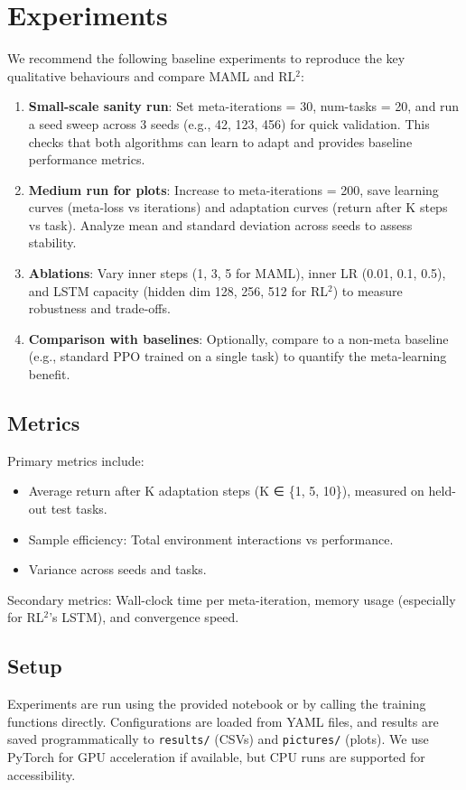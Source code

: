 \documentclass[11pt,a4paper]{article}
\begin{document}
\section{Experiments}
We recommend the following baseline experiments to reproduce the key qualitative behaviours and compare MAML and RL$^2$:
\begin{enumerate}
  \item \textbf{Small-scale sanity run}: Set meta-iterations = 30, num-tasks = 20, and run a seed sweep across 3 seeds (e.g., 42, 123, 456) for quick validation. This checks that both algorithms can learn to adapt and provides baseline performance metrics.
  \item \textbf{Medium run for plots}: Increase to meta-iterations = 200, save learning curves (meta-loss vs iterations) and adaptation curves (return after K steps vs task). Analyze mean and standard deviation across seeds to assess stability.
  \item \textbf{Ablations}: Vary inner steps (1, 3, 5 for MAML), inner LR (0.01, 0.1, 0.5), and LSTM capacity (hidden dim 128, 256, 512 for RL$^2$) to measure robustness and trade-offs.
  \item \textbf{Comparison with baselines}: Optionally, compare to a non-meta baseline (e.g., standard PPO trained on a single task) to quantify the meta-learning benefit.
\end{enumerate}

\subsection{Metrics}
Primary metrics include:
\begin{itemize}
  \item Average return after K adaptation steps (K ∈ \{1, 5, 10\}), measured on held-out test tasks.
  \item Sample efficiency: Total environment interactions vs performance.
  \item Variance across seeds and tasks.
\end{itemize}
Secondary metrics: Wall-clock time per meta-iteration, memory usage (especially for RL$^2$'s LSTM), and convergence speed.

\subsection{Setup}
Experiments are run using the provided notebook or by calling the training functions directly. Configurations are loaded from YAML files, and results are saved programmatically to \texttt{results/} (CSVs) and \texttt{pictures/} (plots). We use PyTorch for GPU acceleration if available, but CPU runs are supported for accessibility.
\end{document}

